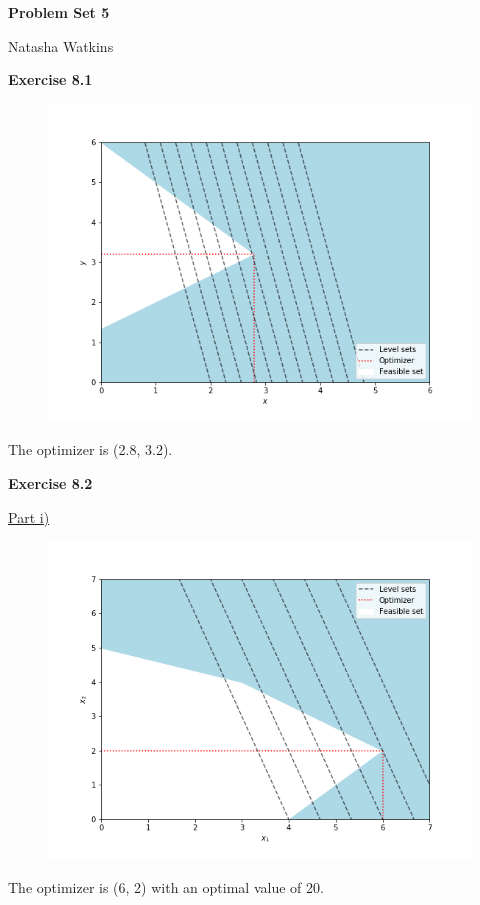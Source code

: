 \documentclass[letterpaper,12pt]{article}
\begin{document}
\textbf{\large Problem Set 5}

Natasha Watkins

\vspace{5mm}

\textbf{Exercise 8.1}
\begin{figure}[H]
	\centering
	\includegraphics[scale=0.45]{plot1.png}
	\label{plot1}
\end{figure}
The optimizer is (2.8, 3.2).

\textbf{Exercise 8.2}

\underline{Part i)}
\begin{figure}[H]
	\centering
	\includegraphics[scale=0.45]{plot2.png}
	\label{plot1}
\end{figure}
The optimizer is (6, 2) with an optimal value of 20.
\end{document}
